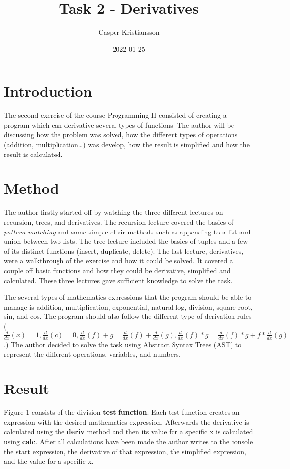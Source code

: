\documentclass[a4paper,11pt]{article}
\begin{document}
\title{
    \textbf{Task 2 - Derivatives}
}
\author{Casper Kristiansson}
\date{2022-01-25}

\maketitle

\section*{Introduction}
The second exercise of the course Programming II consisted of creating a program which can derivative several types of functions. The author will be discussing how the problem was solved, how the different types of operations (addition, multiplication…) was develop, how the result is simplified and how the result is calculated.

\section*{Method}

The author firstly started off by watching the three different lectures on recursion, trees, and derivatives. The recursion lecture covered the basics of \emph{pattern matching} and some simple elixir methods such as appending to a list and union between two lists. The tree lecture included the basics of tuples and a few of its distinct functions (insert, duplicate, delete). The last lecture, derivatives, were a walkthrough of the exercise and how it could be solved. It covered a couple off basic functions and how they could be derivative, simplified and calculated. These three lectures gave sufficient knowledge to solve the task.

The several types of mathematics expressions that the program should be able to manage is addition, multiplication, exponential, natural log, division, square root, sin, and cos. The program should also follow the different type of derivation rules ($ \frac{d}{dx}(x)=1,\frac{d}{dx}(c)=0, \frac{d}{dx}(f)+g=\frac{d}{dx}(f) + \frac{d}{dx}(g), \frac{d}{dx}(f) * g=\frac{d}{dx}(f) * g + f*\frac{d}{dx}(g) $.) The author decided to solve the task using Abstract Syntax Trees (AST) to represent the different operations, variables, and numbers.

\section*{Result}

Figure 1 consists of the division \textbf{test function}. Each test function creates an expression with the desired mathematics expression. Afterwards the derivative is calculated using the \textbf{deriv} method and then its value for a specific x is calculated using \textbf{calc}. After all calculations have been made the author writes to the console the start expression, the derivative of that expression, the simplified expression, and the value for a specific x.
\end{document}
